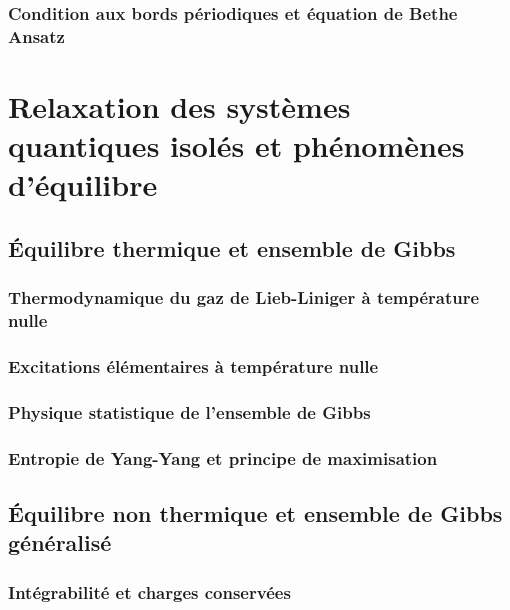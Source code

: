 \subsection{Condition aux bords périodiques et équation de Bethe Ansatz}


\chapter{Relaxation des systèmes quantiques isolés et phénomènes d'équilibre}
\minitoc
\section{Équilibre thermique et ensemble de Gibbs}

\subsection{Thermodynamique du gaz de Lieb-Liniger à température nulle}


\subsection{Excitations élémentaires à température nulle}
\subsection{Physique statistique de l’ensemble de Gibbs}


\subsection{Entropie de Yang-Yang et principe de maximisation}

\section{Équilibre non thermique et ensemble de Gibbs généralisé}

\subsection{Intégrabilité et charges conservées}
